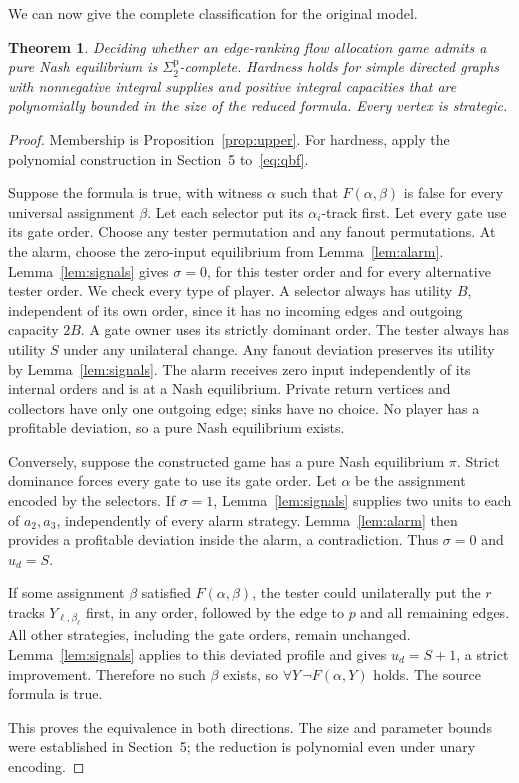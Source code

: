 \documentclass[11pt]{article}
\newtheorem{theorem}{Theorem}
\newcommand{\sig}{\Sigma^{\mathrm p}_2}
\begin{document}
We can now give the complete classification for the original model.
\begin{theorem}\label{thm:main}
Deciding whether an edge-ranking flow allocation game admits a pure Nash equilibrium is $\sig$-complete. Hardness holds for simple directed graphs with nonnegative integral supplies and positive integral capacities that are polynomially bounded in the size of the reduced formula. Every vertex is strategic.
\end{theorem}
\begin{proof}
Membership is Proposition~\ref{prop:upper}. For hardness, apply the polynomial construction in Section~5 to~\eqref{eq:qbf}.

Suppose the formula is true, with witness $\alpha$ such that $F(\alpha,\beta)$ is false for every universal assignment $\beta$. Let each selector put its $\alpha_i$-track first. Let every gate use its gate order. Choose any tester permutation and any fanout permutations. At the alarm, choose the zero-input equilibrium from Lemma~\ref{lem:alarm}. Lemma~\ref{lem:signals} gives $\sigma=0$, for this tester order and for every alternative tester order. We check every type of player. A selector always has utility $B$, independent of its own order, since it has no incoming edges and outgoing capacity $2B$. A gate owner uses its strictly dominant order. The tester always has utility $S$ under any unilateral change. Any fanout deviation preserves its utility by Lemma~\ref{lem:signals}. The alarm receives zero input independently of its internal orders and is at a Nash equilibrium. Private return vertices and collectors have only one outgoing edge; sinks have no choice. No player has a profitable deviation, so a pure Nash equilibrium exists.

Conversely, suppose the constructed game has a pure Nash equilibrium $\pi$. Strict dominance forces every gate to use its gate order. Let $\alpha$ be the assignment encoded by the selectors. If $\sigma=1$, Lemma~\ref{lem:signals} supplies two units to each of $a_2,a_3$, independently of every alarm strategy. Lemma~\ref{lem:alarm} then provides a profitable deviation inside the alarm, a contradiction. Thus $\sigma=0$ and $u_d=S$.

If some assignment $\beta$ satisfied $F(\alpha,\beta)$, the tester could unilaterally put the $r$ tracks $Y_{\ell,\beta_\ell}$ first, in any order, followed by the edge to $p$ and all remaining edges. All other strategies, including the gate orders, remain unchanged. Lemma~\ref{lem:signals} applies to this deviated profile and gives $u_d=S+1$, a strict improvement. Therefore no such $\beta$ exists, so $\forall Y\,\neg F(\alpha,Y)$ holds. The source formula is true.

This proves the equivalence in both directions. The size and parameter bounds were established in Section~5; the reduction is polynomial even under unary encoding.
\end{proof}
\end{document}
